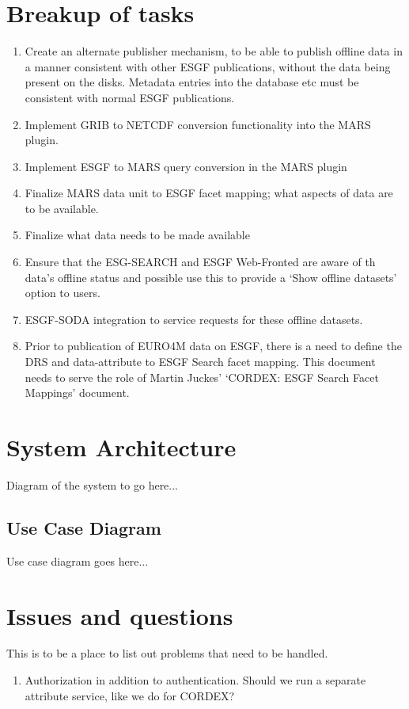 \documentclass[oneside,12pt]{memoir}
\begin{document}
\section{Breakup of tasks}
\begin{enumerate}
\item Create an alternate publisher mechanism, to be able to publish offline data in a manner consistent with other ESGF publications, without the data being present on the disks. Metadata entries into the database etc must be consistent with normal ESGF publications.
\item Implement GRIB to NETCDF conversion functionality into the MARS plugin.
\item Implement ESGF to MARS query conversion in the MARS plugin
\item Finalize MARS data unit to ESGF facet mapping; what aspects of data are to be available.
\item Finalize what data needs to be made available
\item Ensure that the ESG-SEARCH and ESGF Web-Fronted are aware of th data's offline status and possible use this to provide a `Show offline datasets' option to users.
\item ESGF-SODA integration to service requests for these offline datasets.
\item Prior to publication of EURO4M data on ESGF, there is a need to define the DRS and data-attribute to ESGF Search facet mapping. This document needs to serve the
role of Martin Juckes' `CORDEX: ESGF Search Facet Mappings' document.
\end{enumerate}

\section{System Architecture}
Diagram of the system to go here...\\
\subsection{Use Case Diagram}
Use case diagram goes here...

\section{Issues and questions}
This is to be a place to list out problems that need to be handled.
\begin{enumerate}
\item Authorization in addition to authentication. Should we run a separate attribute service, like we do for CORDEX?
\end{enumerate}
\end{document}
